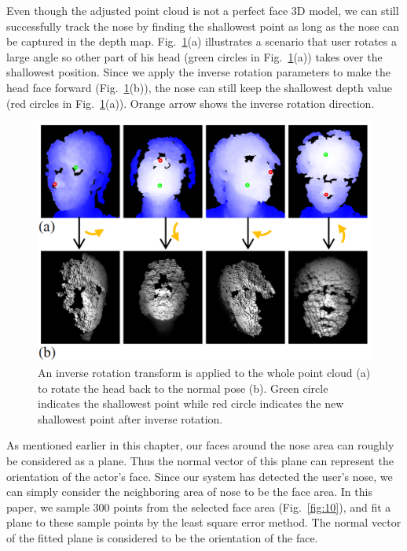 Even though the adjusted point cloud is not a perfect face 3D model, we can still successfully track the nose by finding the shallowest point as long as the nose can be captured in the depth map. Fig.~\ref{fig:9}(a) illustrates a scenario that user rotates a large angle so other part of his head (green circles in Fig.~\ref{fig:9}(a)) takes over the shallowest position. Since we apply the inverse rotation parameters to make the head face forward (Fig.~\ref{fig:9}(b)), the nose can still keep the shallowest depth value (red circles in Fig.~\ref{fig:9}(a)). Orange arrow shows the inverse rotation direction.

\begin{figure}
\includegraphics[width=1.0\linewidth]{./fig9.png}
\caption{An inverse rotation transform is applied to the whole point cloud (a) to rotate the head back to the normal pose (b). Green circle indicates the shallowest point while red circle indicates the new shallowest point after inverse rotation.}
\label{fig:9}       %
\end{figure}

As mentioned earlier in this chapter, our faces around the nose area can roughly be considered as a plane. Thus the normal vector of this plane can represent the orientation of the actor’s face. Since our system has detected the user’s nose, we can simply consider the neighboring area of nose to be the face area. In this paper, we sample 300 points from the selected face area (Fig.~\ref{fig:10}), and fit a plane to these sample points by the least square error method. The normal vector of the fitted plane is considered to be the orientation of the face.

